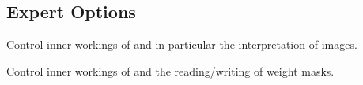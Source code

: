 

\subsection[Expert Options]{Expert Options%
  \label{sec:expert-options}
  }




\ifenblend
  Control inner workings of \app{} and in particular the
  interpretation of images.
\fi

\ifenfuse
  Control inner workings of \app{} and the reading\slash writing of
  weight masks.
\fi



